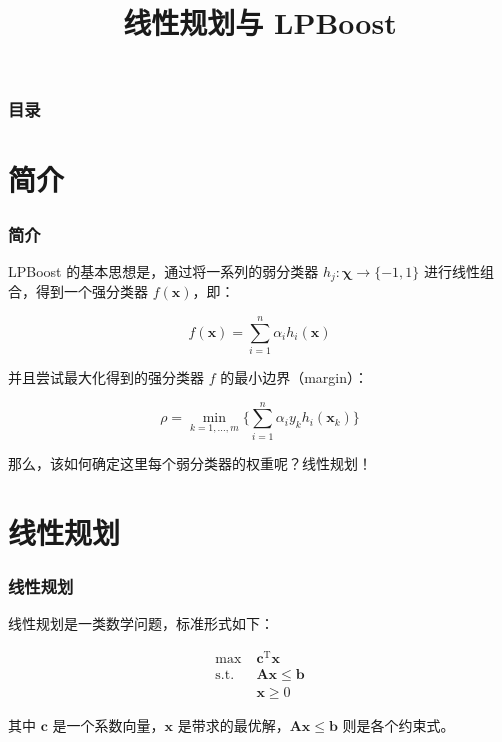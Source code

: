 \documentclass{ctexbeamer}
\author{\theauthor}
\institute[\theshortinst]{\theinst}
\title{线性规划与 LPBoost}
\begin{document}
    \begin{frame}
        \titlepage
    \end{frame}

    \begin{frame}
        \frametitle{目录}
    
        \tableofcontents
    
    \end{frame}

    \section{简介}
    \begin{frame}
        \frametitle{简介}
    
        LPBoost 的基本思想是，通过将一系列的弱分类器 $h_j : \pmb{\chi} \to \{-1, 1\}$ 进行线性组合，得到一个强分类器 $f(\pmb{x})$，即：

        \[
            f(\pmb{x}) = \sum_{i=1}^{n} \alpha_i h_i(\pmb{x})
        \] \pause

        并且尝试最大化得到的强分类器 $f$ 的最小边界（margin）：

        \[
            \rho = \min_{k = 1,\ldots,m}\{\sum_{i=1}^n \alpha_i y_k h_i(\pmb{x}_k) \}
        \] \pause

        那么，该如何确定这里每个弱分类器的权重呢？\pause{}线性规划！
    
    \end{frame}

    \section{线性规划}
    \begin{frame}
        \frametitle{线性规划}
    
        线性规划是一类数学问题，标准形式如下：

        \begin{equation}
            \begin{aligned}
                \max\; & \pmb{c}^\mathrm{T}\pmb{x} \\
                \mathrm{s.t.}\; & \pmb{Ax} \leq \pmb{b} \\
                 & \pmb{x} \geq 0
            \end{aligned}
        \end{equation} \pause

        其中 $\pmb{c}$ 是一个系数向量，$\pmb{x}$ 是带求的最优解，$\pmb{Ax} \leq \pmb{b}$ 则是各个约束式。
    
    \end{frame}
\end{document}
